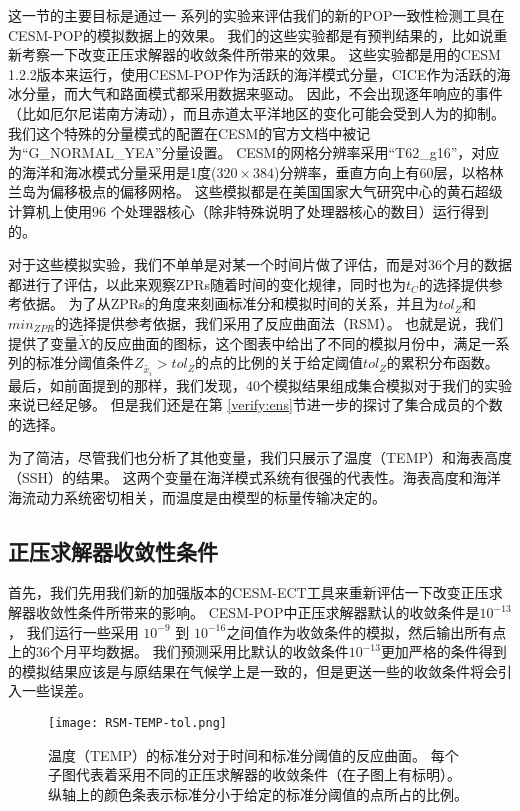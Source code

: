  
这一节的主要目标是通过一 系列的实验来评估我们的新的POP一致性检测工具在CESM-POP的模拟数据上的效果。
我们的这些实验都是有预判结果的，比如说重新考察一下改变正压求解器的收敛条件所带来的效果。
这些实验都是用的CESM 1.2.2版本来运行，使用CESM-POP作为活跃的海洋模式分量，CICE作为活跃的海冰分量，而大气和路面模式都采用数据来驱动。
因此，不会出现逐年响应的事件（比如厄尔尼诺南方涛动），而且赤道太平洋地区的变化可能会受到人为的抑制。
我们这个特殊的分量模式的配置在CESM的官方文档中被记为“G\_NORMAL\_YEA”分量设置。
CESM的网格分辨率采用“T62\_g16”，对应的海洋和海冰模式分量采用是1度($320 \times 384$)分辨率，垂直方向上有60层，以格林兰岛为偏移极点的偏移网格。 
这些模拟都是在美国国家大气研究中心的黄石超级计算机上使用$96$ 个处理器核心（除非特殊说明了处理器核心的数目）运行得到的。 

 对于这些模拟实验，我们不单单是对某一个时间片做了评估，而是对36个月的数据都进行了评估，以此来观察ZPRs随着时间的变化规律，同时也为$t_C$的选择提供参考依据。
为了从ZPRs的角度来刻画标准分和模拟时间的关系，并且为$tol_{Z}$和$min_{ZPR}$的选择提供参考依据，我们采用了反应曲面法（RSM）\cite{box2007}。 
也就是说，我们提供了变量$\tilde{X}$的反应曲面的图标，这个图表中给出了不同的模拟月份中，满足一系列的标准分阈值条件$Z_{\tilde{x_i}} > tol_{Z}$的点的比例的关于给定阈值$tol_{Z}$的累积分布函数。
最后，如前面提到的那样，我们发现，40个模拟结果组成集合模拟对于我们的实验来说已经足够。
但是我们还是在第 \ref{verify:ens}节进一步的探讨了集合成员的个数的选择。  

为了简洁，尽管我们也分析了其他变量，我们只展示了温度（TEMP）和海表高度（SSH）的结果。 
这两个变量在海洋模式系统有很强的代表性。海表高度和海洋海流动力系统密切相关，而温度是由模型的标量传输决定的。
 

\subsection{正压求解器收敛性条件}
\label{verify:ECT:baroSolver}

 
首先，我们先用我们新的加强版本的CESM-ECT工具来重新评估一下改变正压求解器收敛性条件所带来的影响。
CESM-POP中正压求解器默认的收敛条件是$10^{-13}$， 我们运行一些采用 $10^{-9}$ 到 $10^{-16}$之间值作为收敛条件的模拟，然后输出所有点上的36个月平均数据。
我们预测采用比默认的收敛条件$10^{-13}$更加严格的条件得到的模拟结果应该是与原结果在气候学上是一致的，但是更送一些的收敛条件将会引入一些误差。


\begin {figure} 
\centering
\texttt{[image: RSM-TEMP-tol.png]}
\caption {温度（TEMP）的标准分对于时间和标准分阈值的反应曲面。 每个子图代表着采用不同的正压求解器的收敛条件（在子图上有标明）。纵轴上的颜色条表示标准分小于给定的标准分阈值的点所占的比例。}
\label{fig:RSM-TEMP-tol}
\end {figure}
 
